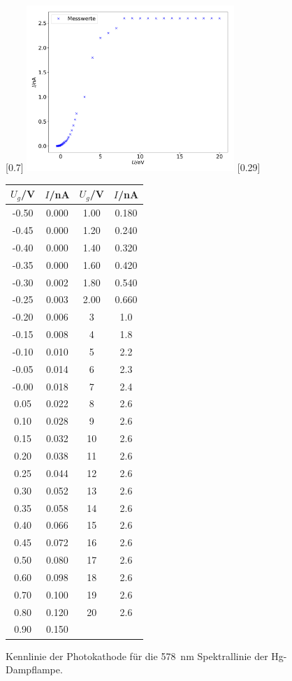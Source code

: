 \begin{figure}
  \centering
  [0.7\textwidth]{
    \includegraphics[width=0.7\textwidth]{Kennlinie.pdf}
    }
  \hfill
  [0.29\textwidth]{
    \begin{tabular}{c c | c c}
      \toprule
      $U_g$/\si{\volt} & $I$/\si{\nano\ampere} & $U_g$/\si{\volt} & $I$/\si{\nano\ampere}\\
      \midrule
      -0.50 & 0.000 & 1.00 & 0.180 \\
      -0.45 & 0.000 & 1.20 & 0.240 \\
      -0.40 & 0.000 & 1.40 & 0.320 \\
      -0.35 & 0.000 & 1.60 & 0.420 \\
      -0.30 & 0.002 & 1.80 & 0.540 \\
      -0.25 & 0.003 & 2.00 & 0.660 \\
      -0.20 & 0.006 & 3 & 1.0 \\
      -0.15 & 0.008 & 4 & 1.8 \\
      -0.10 & 0.010 & 5 & 2.2 \\
      -0.05 & 0.014 & 6 & 2.3 \\
      -0.00 & 0.018 & 7 & 2.4 \\
      0.05 & 0.022 & 8 & 2.6 \\
      0.10 & 0.028 & 9 & 2.6 \\
      0.15 & 0.032 & 10 & 2.6 \\
      0.20 & 0.038 & 11 & 2.6 \\
      0.25 & 0.044 & 12 & 2.6 \\
      0.30 & 0.052 & 13 & 2.6 \\
      0.35 & 0.058 & 14 & 2.6 \\
      0.40 & 0.066 & 15 & 2.6 \\
      0.45 & 0.072 & 16 & 2.6 \\
      0.50 & 0.080 & 17 & 2.6 \\
      0.60 & 0.098 & 18 & 2.6 \\
      0.70 & 0.100 & 19 & 2.6 \\
      0.80 & 0.120 & 20 & 2.6 \\
      0.90 & 0.150 &    &     \\
      \bottomrule
    \end{tabular}
    }
  \hfill
  \caption{Kennlinie der Photokathode für die \SI{578}{\nano\metre} Spektrallinie der
  Hg-Dampflampe.}
\end{figure}
